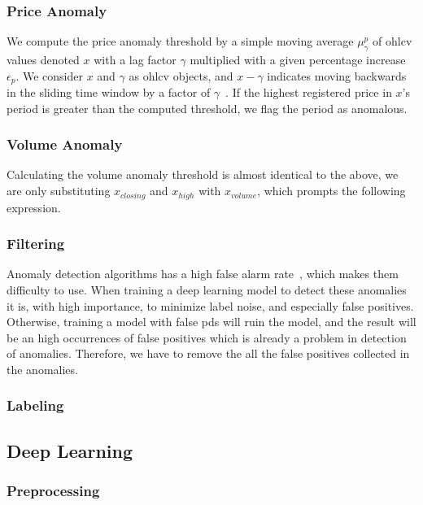 \subsubsection{Price Anomaly}
We compute the price anomaly threshold by a simple moving average $\mu_\gamma^p$ of \ac{ohlcv} values denoted $x$ with a lag factor $\gamma$ multiplied with a given percentage increase $\epsilon_p$. We consider $x$ and $\gamma$ as \ac{ohlcv} objects, and $x-\gamma$ indicates moving backwards in the sliding time window by a factor of $\gamma$~\cite{P&D_to_the_moon}. If the highest registered price in $x$'s period is greater than the computed threshold, we flag the period as anomalous.


\subsubsection{Volume Anomaly}
Calculating the volume anomaly threshold is almost identical to the above, we are only substituting $x_{closing}$ and $x_{high}$ with $x_{volume}$, which prompts the following expression.


\subsubsection{Filtering}
Anomaly detection algorithms has a high false alarm rate~\cite{grill2017reducing}, which makes them difficulty to use. When training a deep learning model to detect these anomalies it is, with high importance, to minimize label noise, and especially false positives. Otherwise, training a model with false \acp{pd} will ruin the model, and the result will be an high occurrences of false positives which is already a problem in detection of anomalies. Therefore, we have to remove the all the false positives collected in the anomalies.

\subsubsection{Labeling}

\subsection{Deep Learning}

\subsubsection{Preprocessing}

